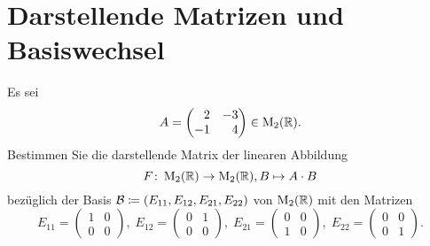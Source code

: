 \section{Darstellende Matrizen und Basiswechsel}


\begin{question}
 Es sei
 \[
  A =
  \begin{pmatrix*}[r]
    2 & -3 \\
   -1 &  4
  \end{pmatrix*}
  \in \Mat_2(\R).
 \]
 Bestimmen Sie die darstellende Matrix der linearen Abbildung
 \[
  F \colon \operatorname{M}_2(\mathbb{R}) \to \operatorname{M}_2(\mathbb{R}), B \mapsto A \cdot B
 \]
 bezüglich der Basis $\mathcal{B} \coloneqq (E_{11}, E_{12}, E_{21}, E_{22})$ von $\operatorname{M}_2(\mathbb{R})$ mit den Matrizen
 \[
  E_{11} = \begin{pmatrix} 1 & 0 \\ 0 & 0 \end{pmatrix},\;
  E_{12} = \begin{pmatrix} 0 & 1 \\ 0 & 0 \end{pmatrix},\;
  E_{21} = \begin{pmatrix} 0 & 0 \\ 1 & 0 \end{pmatrix},\;
  E_{22} = \begin{pmatrix} 0 & 0 \\ 0 & 1 \end{pmatrix}.
 \]
\end{question}
